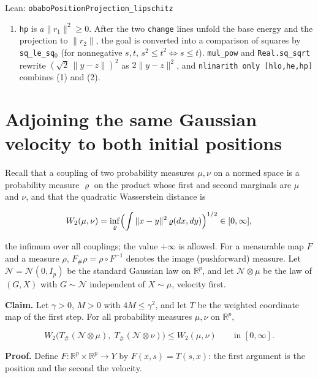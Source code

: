 \documentclass[11pt,a4paper]{article}
\begin{document}
\begin{leanbox}{Lean: \texttt{obaboPositionProjection\_\allowbreak{}lipschitz}}
\begin{enumerate}
\item \texttt{hp} is \(a\|r_1\|^2\ge0\). After the two \texttt{change} lines unfold the base energy and the projection to \(\|r_2\|\), the goal is converted into a comparison of squares by \texttt{sq\_\allowbreak{}le\_\allowbreak{}sq\ensuremath{{}_{0}}} (for nonnegative \(s,t\), \(s^2\le t^2\iff s\le t\)). \texttt{mul\_\allowbreak{}pow} and \texttt{Real.\allowbreak{}sq\_\allowbreak{}sqrt} rewrite \((\sqrt2\,\|y-z\|)^2\) as \(2\|y-z\|^2\), and \texttt{nlinarith only [hlo,he,hp]} combines (1) and (2).

\end{enumerate}
\end{leanbox}

\section{\texorpdfstring{Adjoining the same Gaussian velocity to both initial positions}{Adjoining the same Gaussian velocity to both initial positions}}


Recall that a coupling of two probability measures \(\mu,\nu\) on a normed space is a probability measure \(\varrho\) on the product whose first and second marginals are \(\mu\) and \(\nu\), and that the quadratic Wasserstein distance is


\[W_2(\mu,\nu)=\inf_{\varrho}\Bigl(\int\|x-y\|^2\,\varrho(dx,dy)\Bigr)^{1/2}\in[0,\infty],\]


the infimum over all couplings; the value \(+\infty\) is allowed. For a measurable map \(F\) and a measure \(\rho\), \(F_\#\rho=\rho\circ F^{-1}\) denotes the image (pushforward) measure. Let \(\mathcal N=\mathcal N(0,I_p)\) be the standard Gaussian law on \(\mathbb R^p\), and let \(\mathcal N\otimes\mu\) be the law of \((G,X)\) with \(G\sim\mathcal N\) independent of \(X\sim\mu\), velocity first.




\textbf{Claim.} Let \(\gamma>0\), \(M>0\) with \(4M\le\gamma^2\), and let \(T\) be the weighted coordinate map of the first step. For all probability measures \(\mu,\nu\) on \(\mathbb R^p\),


\[W_2\bigl(T_\#(\mathcal N\otimes\mu),\;T_\#(\mathcal N\otimes\nu)\bigr)\le W_2(\mu,\nu)\qquad\text{in }[0,\infty].\]


\textbf{Proof.} Define \(F:\mathbb R^p\times\mathbb R^p\to Y\) by \(F(x,s)=T(s,x)\): the first argument is the position and the second the velocity.
\end{document}
